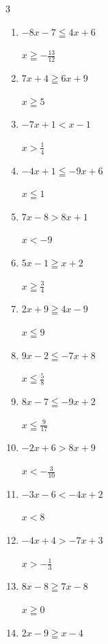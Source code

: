 \begin{multicols}{3}
\begin{enumerate}
        $\displaystyle x\leqq \frac{15}{11}$

  \item $-8x-7\leqq 4x+6$

        $\displaystyle x\geqq -\frac{13}{12}$

  \item $7x+4\geqq 6x+9$

        $\displaystyle x\geqq 5$

  \item $-7x+1<x-1$

        $\displaystyle x>\frac{1}{4}$

  \item $-4x+1\leqq -9x+6$

        $\displaystyle x\leqq 1$

  \item $7x-8>8x+1$

        $\displaystyle x<-9$

  \item $5x-1\geqq x+2$

        $\displaystyle x\geqq \frac{3}{4}$

  \item $2x+9\geqq 4x-9$

        $\displaystyle x\leqq 9$

\columnbreak %

  \item $9x-2\leqq -7x+8$

        $\displaystyle x\leqq \frac{5}{8}$

  \item $8x-7\leqq -9x+2$

        $\displaystyle x\leqq \frac{9}{17}$

  \item $-2x+6>8x+9$

        $\displaystyle x<-\frac{3}{10}$

  \item $-3x-6<-4x+2$

        $\displaystyle x<8$

  \item $-4x+4>-7x+3$

        $\displaystyle x>-\frac{1}{3}$

  \item $8x-8\geqq 7x-8$

        $\displaystyle x\geqq 0$

  \item $2x-9\geqq x-4$


\end{enumerate}
\end{multicols}
